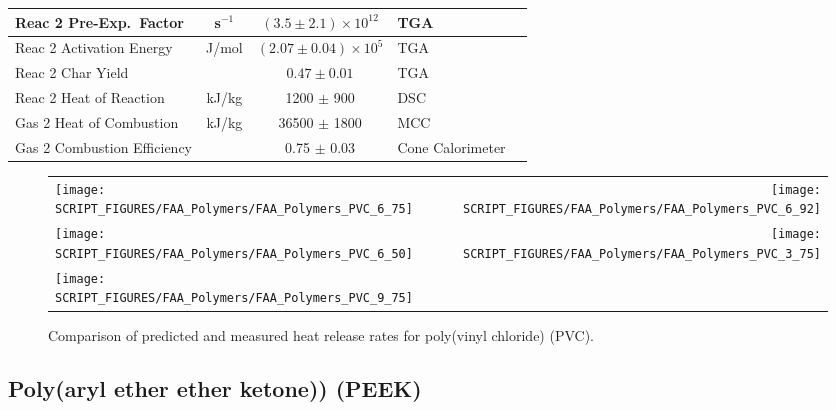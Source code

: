\begin{table}[h!]
\begin{center}
\begin{tabular}{|l|c|c|l|l|}
Reac 2 Pre-Exp.~Factor      & s$^{-1}$      & $(3.5 \pm 2.1) \times 10^{12}$    & TGA                       &  \cite{Stoliarov:CF2010}                  \\ \hline
Reac 2 Activation Energy    & J/mol       & $(2.07 \pm 0.04) \times 10^{5}$   & TGA                       &  \cite{Stoliarov:CF2010}                  \\ \hline
Reac 2 Char Yield           &               & $0.47 \pm 0.01$                   & TGA                       &  \cite{Stoliarov:CF2010}                  \\ \hline
Reac 2 Heat of Reaction     & kJ/kg         & 1200 $\pm$ 900                    & DSC                       &  \cite{Stoliarov:PDS2008}                 \\ \hline
Gas 2 Heat of Combustion    & kJ/kg         & 36500 $\pm$ 1800                  & MCC                       &  \cite{Stoliarov:CF2010}                  \\ \hline
Gas 2 Combustion Efficiency &               & 0.75 $\pm$ 0.03                   & Cone Calorimeter          &  \cite{Stoliarov:CF2010}                  \\ \hline
\end{tabular}
\end{center}
\label{Properties_PVC}
\end{table}

\begin{figure}[p]
\begin{tabular*}{\textwidth}{l@{\extracolsep{\fill}}r}
\texttt{[image: SCRIPT\_FIGURES/FAA\_Polymers/FAA\_Polymers\_PVC\_6\_75]} &
\texttt{[image: SCRIPT\_FIGURES/FAA\_Polymers/FAA\_Polymers\_PVC\_6\_92]} \\
\texttt{[image: SCRIPT\_FIGURES/FAA\_Polymers/FAA\_Polymers\_PVC\_6\_50]} &
\texttt{[image: SCRIPT\_FIGURES/FAA\_Polymers/FAA\_Polymers\_PVC\_3\_75]} \\
\texttt{[image: SCRIPT\_FIGURES/FAA\_Polymers/FAA\_Polymers\_PVC\_9\_75]} &
\end{tabular*}
\caption[Heat release rate of poly(vinyl chloride) (PVC)]
{Comparison of predicted and measured heat release rates for poly(vinyl chloride) (PVC).}
\label{HRR_PVC}
\end{figure}

\clearpage



\subsection{Poly(aryl ether ether ketone)) (PEEK)}

